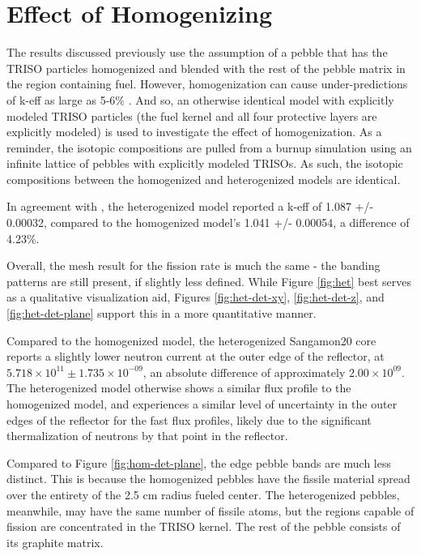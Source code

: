 \section{Effect of Homogenizing}

The results discussed previously use the assumption of a pebble that has the TRISO particles homogenized and blended with the rest of the pebble matrix in the region containing fuel.  However, homogenization can cause under-predictions of k-eff as large as 5-6\% \cite{brown_stochastic_2005}.  And so, an otherwise identical model with explicitly modeled TRISO particles (the fuel kernel and all four protective layers are explicitly modeled) is used to investigate the effect of homogenization.  As a reminder, the isotopic compositions are pulled from a burnup simulation using an infinite lattice of pebbles with explicitly modeled TRISOs.  As such, the isotopic compositions between the homogenized and heterogenized models are identical.





In agreement with \cite{brown_stochastic_2005}, the heterogenized model reported a k-eff of 1.087 +/- 0.00032, compared to the homogenized model's 1.041 +/- 0.00054, a difference of 4.23\%.  

Overall, the mesh result for the fission rate is much the same - the banding patterns are still present, if slightly less defined.  While Figure \ref{fig:het} best serves as a qualitative visualization aid, Figures \ref{fig:het-det-xy}, \ref{fig:het-det-z}, and \ref{fig:het-det-plane} support this in a more quantitative manner.





Compared to the homogenized model, the heterogenized Sangamon20 core reports a slightly lower neutron current at the outer edge of the reflector, at $5.718\times10^{11} \pm 1.735\times10^{-09}$, an absolute difference of approximately $2.00\times10^{09}$.  The heterogenized model otherwise shows a similar flux profile to the homogenized model, and experiences a similar level of uncertainty in the outer edges of the reflector for the fast flux profiles, likely due to the significant thermalization of neutrons by that point in the reflector.







Compared to Figure \ref{fig:hom-det-plane}, the edge pebble bands are much less distinct.  This is because the homogenized pebbles have the fissile material spread over the entirety of the 2.5 cm radius fueled center.  The heterogenized pebbles, meanwhile, may have the same number of fissile atoms, but the regions capable of fission are concentrated in the TRISO kernel.  The rest of the pebble consists of its graphite matrix.


